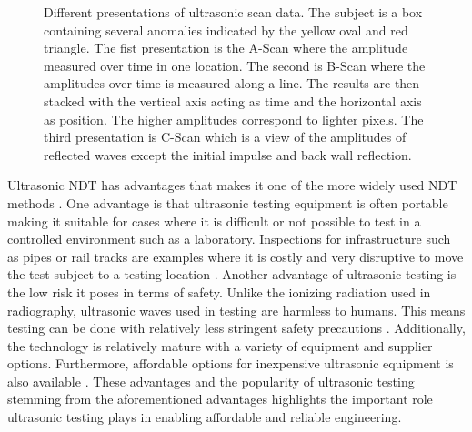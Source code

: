 \begin{figure}[ht]
\centering

\caption{Different presentations of ultrasonic scan data. The subject is a box containing several anomalies indicated by the yellow oval and red triangle. The fist presentation is the A-Scan where the amplitude measured over time in one location. The second is B-Scan where the amplitudes over time is measured along a line. The results are then stacked with the vertical axis acting as time and the horizontal axis as position. The higher amplitudes correspond to lighter pixels. The third presentation is C-Scan which is a view of the amplitudes of reflected waves except the initial impulse and back wall reflection.}
\label{fig:us_presentation}
\end{figure}

Ultrasonic NDT has advantages that makes it one of the more widely used NDT methods \autocite{howell2020nondestructive, nivenFullWaveformInversion2020, feliceSizingFlawsUsing2018}. One advantage is that ultrasonic testing equipment is often portable making it suitable for cases where it is difficult or not possible to test in a controlled environment such as a laboratory. Inspections for infrastructure such as pipes or rail tracks are examples where it is costly and very disruptive to move the test subject to a testing location \autocite{}. Another advantage of ultrasonic testing is the low risk it poses in terms of safety. Unlike the ionizing radiation used in radiography, ultrasonic waves used in testing are harmless to humans. This means testing can be done with relatively less stringent safety precautions \autocite{}. Additionally, the technology is relatively mature with a variety of equipment and supplier options. Furthermore, affordable options for inexpensive ultrasonic equipment is also available \autocite{}. These advantages and the popularity of ultrasonic testing stemming from the aforementioned advantages highlights the important role ultrasonic testing plays in enabling affordable and reliable engineering.


